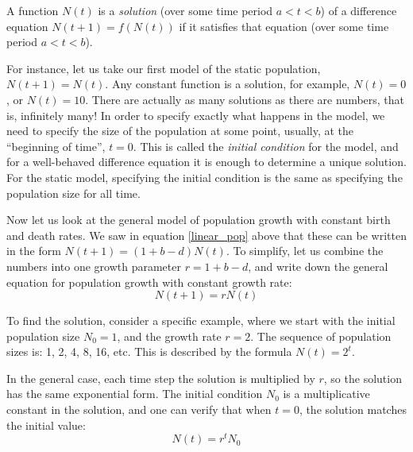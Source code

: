 \documentclass[
  letterpaper,
  DIV=11,
  numbers=noendperiod]{scrreprt}
\begin{document}
\begin{tcolorbox}[enhanced jigsaw, coltitle=black, arc=.35mm, opacitybacktitle=0.6, breakable, bottomtitle=1mm, toptitle=1mm, titlerule=0mm, colback=white, leftrule=.75mm, rightrule=.15mm, colframe=quarto-callout-note-color-frame, colbacktitle=quarto-callout-note-color!10!white, opacityback=0, title=\textcolor{quarto-callout-note-color}{\faInfo}\hspace{0.5em}{Definition}, left=2mm, toprule=.15mm, bottomrule=.15mm]

A function \(N(t)\) is a
\emph{solution} (over some time
period \(a < t < b\)) of a difference equation \(N(t+1) = f(N(t))\) if
it satisfies that equation (over some time period \(a < t < b\)).

\end{tcolorbox}

\label{def:math14_sol}

For instance, let us take our first model of the static population,
\(N(t+1) = N(t)\). Any constant function is a solution, for example,
\(N(t) = 0\), or \(N(t) = 10\). There are actually as many solutions as
there are numbers, that is, infinitely many! In order to specify exactly
what happens in the model, we need to specify the size of the population
at some point, usually, at the ``beginning of time'', \(t = 0\). This is
called the  \emph{initial condition} for the
model, and for a well-behaved difference equation it is enough to
determine a unique solution. For the static model, specifying the
initial condition is the same as specifying the population size for all
time.

Now let us look at the general model of population growth with constant
birth and death rates. We saw in equation \ref{linear_pop} above that
these can be written in the form \(N(t+1) = (1 + b - d) N(t)\). To
simplify, let us combine the numbers into one growth parameter
\(r = 1 + b - d\), and write down the general equation for population
growth with constant growth rate: \[N(t+1) =  rN(t)\]

To find the solution, consider a specific example, where we start with
the initial population size \(N_0 = 1\), and the growth rate \(r=2\).
The sequence of population sizes is: 1, 2, 4, 8, 16, etc. This is
described by the formula \(N(t) = 2^t\).

In the general case, each time step the solution is multiplied by \(r\),
so the solution has the same exponential form. The initial condition
\(N_0\) is a multiplicative constant in the solution, and one can verify
that when \(t=0\), the solution matches the initial value:
\begin{equation}
N(t)  = r^t N_0
\label{eq:lin_discrete_sol}
\end{equation}
\end{document}
